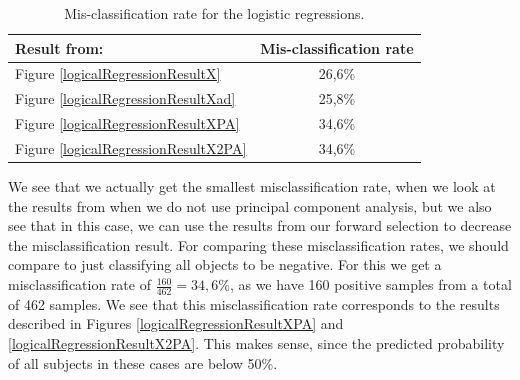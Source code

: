 \begin{table}[H]
\begin{longtable}{lc} \hline
Result from: & Mis-classification rate \\ \hline
Figure \ref{logicalRegressionResultX} & 26,6\% \\ 
Figure \ref{logicalRegressionResultXad} & 25,8\% \\ 
Figure \ref{logicalRegressionResultXPA} & 34,6\% \\ 
Figure \ref{logicalRegressionResultX2PA} & 34,6\% \\ \hline
\end{longtable}
\caption{Mis-classification rate for the logistic regressions.}
\label{logicalRegressionErrorRate}
\end{table}
We see that we actually get the smallest misclassification rate, when we look at the results from when we do not use principal component analysis, but we also see that in this case, we can use the results from our forward selection to decrease the misclassification result. For comparing these misclassification rates, we should compare to just classifying all objects to be negative. For this we get a misclassification rate of $\frac{160}{462}=34,6\%$, as we have 160 positive samples from a total of 462 samples. We see that this misclassification rate corresponds to the results described in Figures \ref{logicalRegressionResultXPA} and \ref{logicalRegressionResultX2PA}. This makes sense, since the predicted probability of all subjects in these cases are below 50\%.